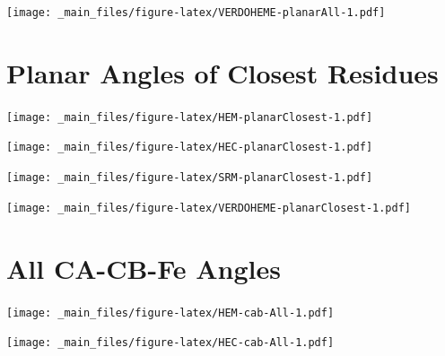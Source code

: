 \documentclass[a4paper, nobind]{templates/ociamthesis}
\let\origfigure\figure
\let\endorigfigure\endfigure
\renewenvironment{figure}[1][2] {
    \expandafter\origfigure\expandafter[H]
} {
    \endorigfigure
}
\begin{document}
\begin{figure}
\centering
\texttt{[image: \_main\_files/figure-latex/VERDOHEME-planarAll-1.pdf]}
\caption{\label{fig:VERDOHEME-planarAll}VERDOHEME: All Planar Angles}
\end{figure}

\hypertarget{figs-planarClosest}{%
\section{Planar Angles of Closest Residues}\label{figs-planarClosest}}

\begin{figure}
\centering
\texttt{[image: \_main\_files/figure-latex/HEM-planarClosest-1.pdf]}
\caption{\label{fig:HEM-planarClosest}HEM: Planar Angles of Closest Residues}
\end{figure}

\begin{figure}
\centering
\texttt{[image: \_main\_files/figure-latex/HEC-planarClosest-1.pdf]}
\caption{\label{fig:HEC-planarClosest}HEC: Planar Angles of Closest Residues}
\end{figure}

\begin{figure}
\centering
\texttt{[image: \_main\_files/figure-latex/SRM-planarClosest-1.pdf]}
\caption{\label{fig:SRM-planarClosest}SRM: Planar Angles of Closest Residues}
\end{figure}

\begin{figure}
\centering
\texttt{[image: \_main\_files/figure-latex/VERDOHEME-planarClosest-1.pdf]}
\caption{\label{fig:VERDOHEME-planarClosest}VERDOHEME: Planar Angles of Closest Residues}
\end{figure}

\hypertarget{figs-cabAll}{%
\section{All CA-CB-Fe Angles}\label{figs-cabAll}}

\begin{figure}
\centering
\texttt{[image: \_main\_files/figure-latex/HEM-cab-All-1.pdf]}
\caption{\label{fig:HEM-cab-All}HEM: All CA-CB-Fe Angles}
\end{figure}

\begin{figure}
\centering
\texttt{[image: \_main\_files/figure-latex/HEC-cab-All-1.pdf]}
\caption{\label{fig:HEC-cab-All}HEC: All CA-CB-Fe Angles}
\end{figure}
\end{document}
